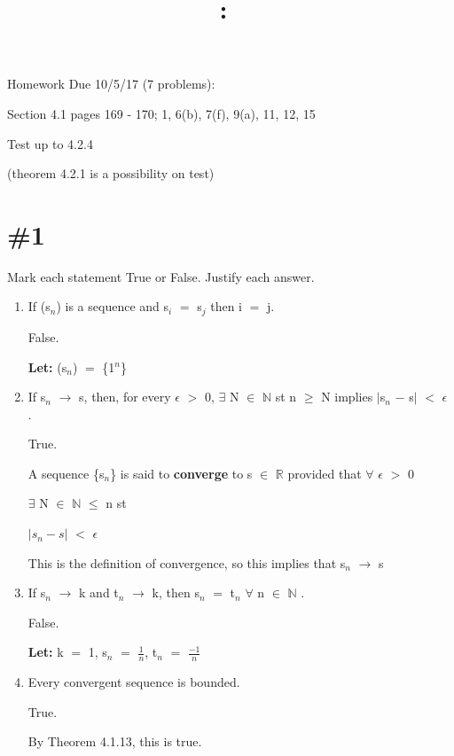 \documentclass{article}
\title{
    \vspace{2in}
    \textmd{\textbf{\hmwkClass:\ \hmwkTitle}}\\
    \normalsize\vspace{0.1in}\small\vspace{0.1in}\large{\textit{\hmwkClassInstructor}}
    \vspace{3in}
}
\author{\hmwkAuthorName}
\date{}
\newcommand{\mt}[1]{\ensuremath{#1}}
\newcommand\bsc[2][\DefaultOpt]{%
  \def\DefaultOpt{#2}%
  \section[#1]{#2}%
}
\newcommand{\balist}{\begin{enumerate}[label=\alph*.]}
\newcommand{\elist}{\end{enumerate}}
\newcommand{\lt}[1]{\textbf{Let: } #1}
\newcommand{\br}{\mt{\mathbb{R}} }       %
\newcommand{\bn}{\mt{\mathbb{N}} }       %
\newcommand{\ep}{\mt{\epsilon} }         %
\newcommand{\fa}{\mt{\forall} }          %
\newcommand{\mem}{\mt{\in} }
\newcommand{\exs}{\mt{\exists} }
\newcommand{\lra}{ \mt{\longrightarrow} } %
\newcommand{\prn}[1]{(#1)}
\newcommand{\bk}[1]{\{#1\}}
\newcommand{\eql}{\mt{=} }
\newcommand{\uw}[2]{#1\mt{_{#2}}}
\newcommand{\uf}[2]{#1\mt{^{#2}}}
\newcommand{\frc}[2]{\mt{\frac{#1}{#2}}}
\begin{document}
Homework Due 10/5/17 (7 problems): 

Section 4.1 pages 169 - 170; 1, 6(b), 7(f), 9(a), 11, 12, 15

Test up to 4.2.4

(theorem 4.2.1 is a possibility on test)

\bsc{\#1}{

Mark each statement True or False. Justify each answer.

\balist
\item If (\uw{s}{n}) is a sequence and \uw{s}{i} \eql \uw{s}{j} then i \eql j.
	
	False.
	
	\lt{\prn{\uw{s}{n}}} \eql \bk{\uf{1}{n}}
\item If \uw{s}{n} \lra s, then, for every \ep $>$ 0, \exs N \mem \bn st n $\geq$ N implies $|$\uw{s}{n} $-$ s$|$ $<$ \ep.
	
	True.
	
	A sequence \{\uw{s}{n}\} is said to \textbf{converge} to s \mem \br provided that \fa \ep $>$ 0

	\exs N \mem \bn $\leq$ n st 

	$|\uw{s}{n} - s|$ $<$ \ep \textrm{   }
	
	This is the definition of convergence, so this implies that \uw{s}{n} \lra s
\item If \uw{s}{n} \lra k and \uw{t}{n} \lra k, then \uw{s}{n} \eql \uw{t}{n} \fa n \mem \bn.
	
	False.
	
	\lt{k \eql 1, \uw{s}{n} \eql \frc{1}{n}, \uw{t}{n} \eql \frc{-1}{n}}
\item Every convergent sequence is bounded.

	True.
	
	By Theorem 4.1.13, this is true.
\elist
}
\newpage
\end{document}
